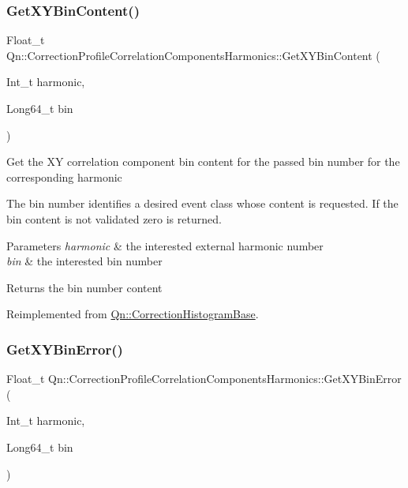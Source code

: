 \subsubsection{\texorpdfstring{Get\+X\+Y\+Bin\+Content()}{GetXYBinContent()}}
{\footnotesize\ttfamily Float\+\_\+t Qn\+::\+Correction\+Profile\+Correlation\+Components\+Harmonics\+::\+Get\+X\+Y\+Bin\+Content (\begin{DoxyParamCaption}\item[{Int\+\_\+t}]{harmonic,  }\item[{Long64\+\_\+t}]{bin }\end{DoxyParamCaption})\hspace{0.3cm}{\ttfamily [virtual]}}

Get the XY correlation component bin content for the passed bin number for the corresponding harmonic

The bin number identifies a desired event class whose content is requested. If the bin content is not validated zero is returned.


\begin{DoxyParams}{Parameters}
{\em harmonic} & the interested external harmonic number \\
\hline
{\em bin} & the interested bin number \\
\hline
\end{DoxyParams}
\begin{DoxyReturn}{Returns}
the bin number content 
\end{DoxyReturn}


Reimplemented from \mbox{\hyperlink{classQn_1_1CorrectionHistogramBase_a88e6cd702547df1b8ea0fcc371dc090d}{Qn\+::\+Correction\+Histogram\+Base}}.

\mbox{\label{classQn_1_1CorrectionProfileCorrelationComponentsHarmonics_ac3aada46be56f35fa487ed621889b121}} 
\subsubsection{\texorpdfstring{Get\+X\+Y\+Bin\+Error()}{GetXYBinError()}}
{\footnotesize\ttfamily Float\+\_\+t Qn\+::\+Correction\+Profile\+Correlation\+Components\+Harmonics\+::\+Get\+X\+Y\+Bin\+Error (\begin{DoxyParamCaption}\item[{Int\+\_\+t}]{harmonic,  }\item[{Long64\+\_\+t}]{bin }\end{DoxyParamCaption})\hspace{0.3cm}{\ttfamily [virtual]}}

